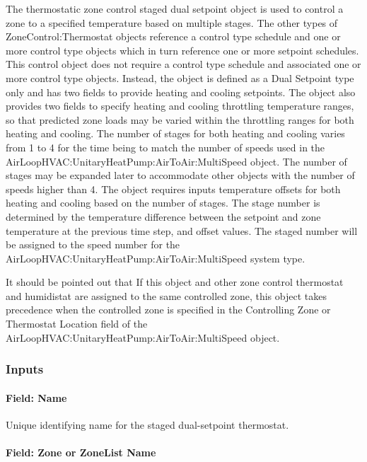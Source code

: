The thermostatic zone control staged dual setpoint object is used to control a zone to a specified temperature based on multiple stages. The other types of ZoneControl:Thermostat objects reference a control type schedule and one or more control type objects which in turn reference one or more setpoint schedules. This control object does not require a control type schedule and associated one or more control type objects. Instead, the object is defined as a Dual Setpoint type only and has two fields to provide heating and cooling setpoints. The object also provides two fields to specify heating and cooling throttling temperature ranges, so that predicted zone loads may be varied within the throttling ranges for both heating and cooling. The number of stages for both heating and cooling varies from 1 to 4 for the time being to match the number of speeds used in the AirLoopHVAC:UnitaryHeatPump:AirToAir:MultiSpeed object. The number of stages may be expanded later to accommodate other objects with the number of speeds higher than 4. The object requires inputs temperature offsets for both heating and cooling based on the number of stages. The stage number is determined by the temperature difference between the setpoint and zone temperature at the previous time step, and offset values. The staged number will be assigned to the speed number for the AirLoopHVAC:UnitaryHeatPump:AirToAir:MultiSpeed system type.

It should be pointed out that If this object and other zone control thermostat and humidistat are assigned to the same controlled zone, this object takes precedence when the controlled zone is specified in the Controlling Zone or Thermostat Location field of the AirLoopHVAC:UnitaryHeatPump:AirToAir:MultiSpeed object.

\subsubsection{Inputs}\label{inputs-7-030}

\paragraph{Field: Name}\label{field-name-5-028}

Unique identifying name for the staged dual-setpoint thermostat.

\paragraph{Field: Zone or ZoneList Name}\label{field-zone-or-zonelist-name-1-001}

